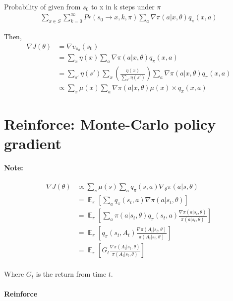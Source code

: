 \documentclass{article}
\begin{document}
Probability of given from $s_0$ to x in k steps under $\pi$
\begin{align*}
\sum_{x \in S}\sum_{k=0}^{\infty}Pr(s_0 \rightarrow x, k, \pi)\sum_a\nabla\pi(a|x,\theta)q_{\pi}(x, a)
\end{align*}

Then,
\begin{align*}
\nabla J(\theta) &= \nabla v_{\pi_{\theta}}(s_0) \\
  &= \sum_x\eta(x) \sum_a\nabla \pi(a|x, \theta)q_{\pi}(x, a) \\
  &= \sum_{s'}\eta(s')\sum_x \left(\frac{\eta(x)}{\sum_{s'}\eta(s')}\right) \sum_a \nabla \pi(a|x, \theta)q_{\pi}(x, a) \\
  &\propto \sum_x\mu(x)\sum_a\nabla\pi(a|x, \theta)\mu(x) \times q_{\pi}(x, a)
\end{align*}


\section{Reinforce: Monte-Carlo policy gradient}
\label{sec:reinf-monte-carlo}

\paragraph{Note:}

\begin{align*}
 \nabla J(\theta) &\propto \sum_s \mu(s) \sum_aq_{\pi}(s, a) \nabla_{\theta}\pi(a|s, \theta) \\
  &= \mathop{\mathbb{E}}_{\pi} \left[ \sum_aq_{\pi}(s_t, a) \nabla \pi(a|s_t, \theta) \right] \\
  &= \mathop{\mathbb{E}}_{\pi} \left[ \sum_a\pi(a|s_t, \theta)q_{\pi}(s_t, a) \frac{\nabla \pi(a|s_t, \theta)}{\pi(a|s_t, \theta)} \right] \\
  &= \mathop{\mathbb{E}}_{\pi} \left[ q_{\pi}(s_t, A_t) \frac{\nabla \pi(A_t|s_t, \theta)}{\pi(A_t|s_t, \theta)} \right] \\
  &= \mathop{\mathbb{E}}_{\pi} \left[ G_t \frac{\nabla \pi(A_t|s_t, \theta)}{\pi(A_t|s_t, \theta)} \right] \\
\end{align*} 

Where $G_t$ is the return from time $t$.

\paragraph{Reinforce}
\end{document}
